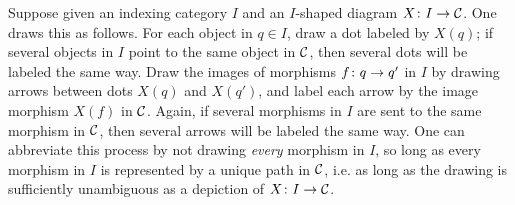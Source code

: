 \documentclass[CT4S-EN-RU]{subfiles}
\begin{document}
\begin{definitionRUS}
\end{definitionRUS}

\begin{blockENG}
Suppose given an indexing category $I$ and an $I$-shaped diagram $X\colon I\rightarrow\mathcal{C}$. One draws this as follows. For each object in $q\in I$, draw a dot labeled by $X(q)$; if several objects in $I$ point to the same object in $\mathcal{C}$, then several dots will be labeled the same way. Draw the images of morphisms $f\colon q\rightarrow q'$ in $I$ by drawing arrows between dots $X(q)$ and $X(q')$, and label each arrow by the image morphism $X(f)$ in $\mathcal{C}$. Again, if several morphisms in $I$ are sent to the same morphism in $\mathcal{C}$, then several arrows will be labeled the same way. One can abbreviate this process by not drawing {\em every} morphism in $I$, so long as every morphism in $I$ is represented by a unique path in $\mathcal{C}$, i.e. as long as the drawing is sufficiently unambiguous as a depiction of $X\colon I\rightarrow\mathcal{C}$.
\end{blockENG}

\begin{blockRUS}
\end{blockRUS}
\end{document}
